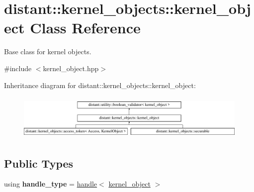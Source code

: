 \hypertarget{classdistant_1_1kernel__objects_1_1kernel__object}{}\section{distant\+:\+:kernel\+\_\+objects\+:\+:kernel\+\_\+object Class Reference}
\label{classdistant_1_1kernel__objects_1_1kernel__object}


Base class for kernel objects.  




{\ttfamily \#include $<$kernel\+\_\+object.\+hpp$>$}

Inheritance diagram for distant\+:\+:kernel\+\_\+objects\+:\+:kernel\+\_\+object\+:\begin{figure}[H]
\begin{center}
\leavevmode
\includegraphics[height=2.234043cm]{classdistant_1_1kernel__objects_1_1kernel__object}
\end{center}
\end{figure}
\subsection*{Public Types}
\begin{DoxyCompactItemize}
\item 
\mbox{\label{classdistant_1_1kernel__objects_1_1kernel__object_aa51e24680263a8b22bcf8b8ac77380a3}} 
using {\bfseries handle\+\_\+type} = \mbox{\hyperlink{classdistant_1_1handle}{handle}}$<$ \mbox{\hyperlink{classdistant_1_1kernel__objects_1_1kernel__object}{kernel\+\_\+object}} $>$
\end{DoxyCompactItemize}
